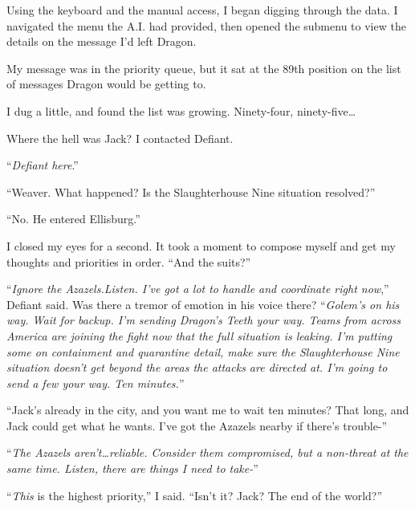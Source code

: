 Using the keyboard and the manual access, I began digging through the data.  I navigated the menu the A.I. had provided, then opened the submenu to view the details on the message I'd left Dragon.



My message was in the priority queue, but it sat at the 89th position on the list of messages Dragon would be getting to.



I dug a little, and found the list was growing.  Ninety-four, ninety-five\ldots



Where the hell was Jack?  I contacted Defiant.



``\emph{Defiant here}.''



``Weaver.  What happened?  Is the Slaughterhouse Nine situation resolved?''



``No.  He entered Ellisburg.''



I closed my eyes for a second.  It took a moment to compose myself and get my thoughts and priorities in order.  ``And the suits?''



``\emph{Ignore the Azazels.}\emph{Listen.  I've got a lot to handle and coordinate right now},'' Defiant said.  Was there a tremor of emotion in his voice there?  ``\emph{Golem's on his way.  Wait for backup.  I'm sending Dragon's Teeth your way.  Teams from across America are joining the fight now that the full situation is leaking. I'm putting some on containment and quarantine detail, make sure the Slaughterhouse Nine situation doesn't get beyond the areas the attacks are directed at.  I'm going to send a few your way.  Ten minutes.}''



``Jack's already in the city, and you want me to wait ten minutes?  That long, and Jack could get what he wants.  I've got the Azazels nearby if there's trouble-''



``\emph{The Azazels aren't\ldots reliable.  Consider them compromised, but a non-threat at the same time.  Listen, there are things I need to take-}''



``\emph{This} is the highest priority,'' I said.  ``Isn't it?  Jack?  The end of the world?''



